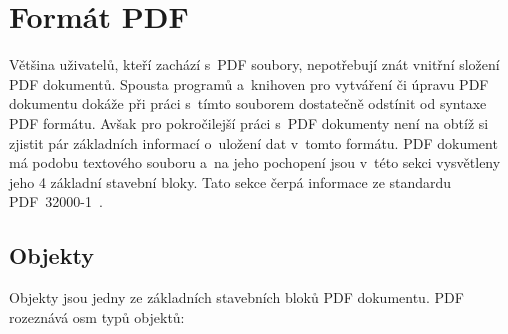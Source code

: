 \section{Formát PDF} \label{format_PDF}
Většina uživatelů, kteří zachází s~PDF soubory, nepotřebují znát vnitřní složení
PDF dokumentů. Spousta programů a~knihoven pro vytváření či úpravu PDF dokumentu
dokáže při práci s~tímto souborem dostatečně odstínit od syntaxe PDF formátu.
Avšak pro pokročilejší práci s~PDF dokumenty není na obtíž si zjistit pár
základních informací o~uložení dat v~tomto formátu.
PDF dokument má podobu textového souboru a~na jeho pochopení jsou v~této sekci
vysvětleny jeho 4 základní stavební bloky. Tato sekce čerpá informace ze
standardu PDF~32000-1~\cite[k.~7, s.~11--109]{PDF32000-1:2008}.


\subsection*{Objekty}
Objekty jsou jedny ze základních stavebních bloků PDF dokumentu. PDF rozeznává
osm typů objektů:
